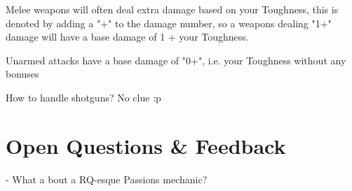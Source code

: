 Melee weapons will often deal extra damage based on your Toughness, this is denoted by adding a "+" to the damage number, so a weapons dealing "1+" damage will have a base damage of 1 + your Toughness.

Unarmed attacks have a base damage of "0+", i.e. your Toughness without any bonuses


How to handle shotguns? No clue :p


\chapter{Open Questions \& Feedback}
  - What a bout a RQ-esque Passions mechanic?
